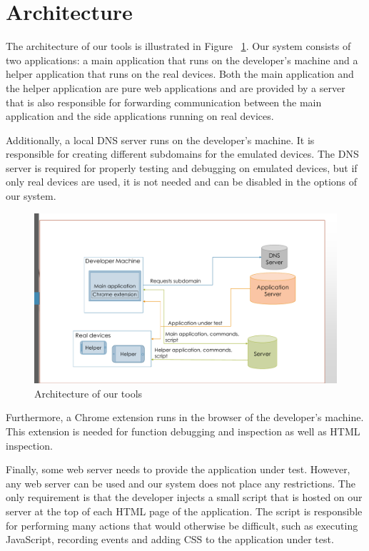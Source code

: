 \section{Architecture}

The architecture of our tools is illustrated in Figure ~\ref{fig:architecture}. Our system consists of two applications: a main application that runs on the developer's machine and a helper application that runs on the real devices. Both the main application and the helper application are pure web applications and are provided by a server that is also responsible for forwarding communication between the main application and the side applications running on real devices.

Additionally, a local DNS server runs on the developer's machine. It is responsible for creating different subdomains for the emulated devices. The DNS server is required for properly testing and debugging on emulated devices, but if only real devices are used, it is not needed and can be disabled in the options of our system.

\begin{figure}[H]
  \centering
    \includegraphics[width=1.0\textwidth]{images/architecture_2.pdf}
	\caption{Architecture of our tools}
	\label{fig:architecture}
\end{figure}

Furthermore, a Chrome extension runs in the browser of the developer's machine. This extension is needed for function debugging and inspection as well as HTML inspection.

Finally, some web server needs to provide the application under test. However, any web server can be used and our system does not place any restrictions. The only requirement is that the developer injects a small script that is hosted on our server at the top of each HTML page of the application. The script is responsible for performing many actions that would otherwise be difficult, such as executing JavaScript, recording events and adding CSS to the application under test.

